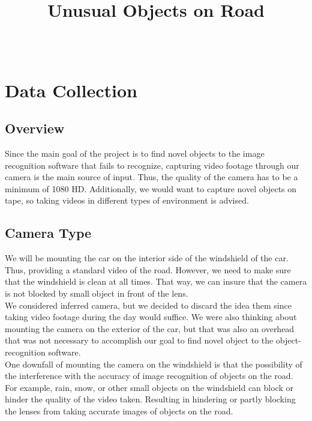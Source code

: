 \documentclass[10pt,draftclsnofoot,onecolumn,journal,compsoc]{IEEEtran}
\title{Unusual Objects on Road}
\author{
  \IEEEauthorblockN{Team (Group 32) name: Teaching AutoPilot to Dodge\\ Basil Al Zamil} \\
  \IEEEauthorblockA{CS 462: Senior Capstone Fall 2016 \\ Oregon State University}
}
\date{}
\begin{document}
\maketitle
\IEEEdisplaynontitleabstractindextext
\IEEEpeerreviewmaketitle

\newpage

\tableofcontents

\newpage


\section{Data Collection}
\subsection{Overview}

Since the main goal of the project is to find novel objects to the image recognition software that fails to recognize, capturing video footage through our camera is the main source of input. Thus, the quality of the camera has to be a minimum of 1080 HD. Additionally, we would want to capture novel objects on tape, so taking videos in different types of environment is advised.   
\\

\subsection{Camera Type}
We will be mounting the car on the interior side of the windshield of the car. Thus, providing a standard video of the road. However, we need to make sure that the windshield is clean at all times. That way, we can insure that the camera is not blocked by small object in front of the lens. \\

We considered inferred camera, but we decided to discard the idea them since taking video footage during the day would suffice. We were also thinking about mounting the camera on the exterior of the car, but that was also an overhead that was not necessary to accomplish our goal to find novel object to the object-recognition software.\\

One downfall of mounting the camera on the windshield is that the possibility of the interference with the accuracy of image recognition of objects on the road. For example, rain, snow, or other small objects on the windshield can block or hinder the quality of the video taken. Resulting in hindering or partly blocking the lenses from taking accurate images of objects on the road.
\end{document}
